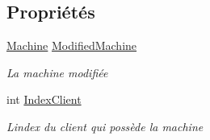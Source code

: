 \subsection*{Propriétés}
\begin{DoxyCompactItemize}
\item 
\mbox{\hyperlink{class_m_t_connect_agent_1_1_model_1_1_machine}{Machine}} \mbox{\hyperlink{class_m_t_connect_agent_1_1_form_modifie_machine_ad14ae74d3b5cd3987f6a9604514eb3c1}{Modified\+Machine}}
\begin{DoxyCompactList}\small\item\em La machine modifiée \end{DoxyCompactList}\item 
int \mbox{\hyperlink{class_m_t_connect_agent_1_1_form_modifie_machine_a3f000e4c915524cf56e0ef077c1a9c96}{Index\+Client}}
\begin{DoxyCompactList}\small\item\em L\textquotesingle{}index du client qui possède la machine \end{DoxyCompactList}\end{DoxyCompactItemize}
